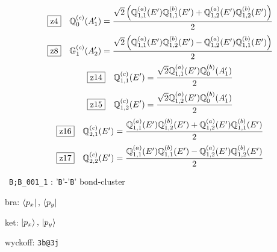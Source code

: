 \documentclass[fleqn,10pt,landscape]{jsarticle}
\begin{document}
\begin{dmath*}
\hspace*{3mm}\fbox{z4}\quad \mathbb{Q}_{0}^{(c)}(A_{1}^{\prime})=\frac{\sqrt{2} \left(\mathbb{Q}_{1,1}^{(a)}(E^{\prime}) \mathbb{Q}_{1,1}^{(b)}(E^{\prime}) + \mathbb{Q}_{1,2}^{(a)}(E^{\prime}) \mathbb{Q}_{1,2}^{(b)}(E^{\prime})\right)}{2}
\end{dmath*}
\begin{dmath*}
\hspace*{3mm}\fbox{z8}\quad \mathbb{G}_{1}^{(c)}(A_{2}^{\prime})=\frac{\sqrt{2} \left(\mathbb{Q}_{1,1}^{(a)}(E^{\prime}) \mathbb{Q}_{1,2}^{(b)}(E^{\prime}) - \mathbb{Q}_{1,2}^{(a)}(E^{\prime}) \mathbb{Q}_{1,1}^{(b)}(E^{\prime})\right)}{2}
\end{dmath*}
\begin{dmath*}
\hspace*{3mm}\fbox{z14}\quad \mathbb{Q}_{1,1}^{(c)}(E^{\prime})=\frac{\sqrt{2} \mathbb{Q}_{1,1}^{(a)}(E^{\prime}) \mathbb{Q}_{0}^{(b)}(A_{1}^{\prime})}{2}
\end{dmath*}
\begin{dmath*}
\hspace*{3mm}\fbox{z15}\quad \mathbb{Q}_{1,2}^{(c)}(E^{\prime})=\frac{\sqrt{2} \mathbb{Q}_{1,2}^{(a)}(E^{\prime}) \mathbb{Q}_{0}^{(b)}(A_{1}^{\prime})}{2}
\end{dmath*}
\begin{dmath*}
\hspace*{3mm}\fbox{z16}\quad \mathbb{Q}_{2,1}^{(c)}(E^{\prime})=\frac{\mathbb{Q}_{1,1}^{(a)}(E^{\prime}) \mathbb{Q}_{1,2}^{(b)}(E^{\prime}) + \mathbb{Q}_{1,2}^{(a)}(E^{\prime}) \mathbb{Q}_{1,1}^{(b)}(E^{\prime})}{2}
\end{dmath*}
\begin{dmath*}
\hspace*{3mm}\fbox{z17}\quad \mathbb{Q}_{2,2}^{(c)}(E^{\prime})=\frac{\mathbb{Q}_{1,1}^{(a)}(E^{\prime}) \mathbb{Q}_{1,1}^{(b)}(E^{\prime}) - \mathbb{Q}_{1,2}^{(a)}(E^{\prime}) \mathbb{Q}_{1,2}^{(b)}(E^{\prime})}{2}
\end{dmath*}
\vspace{5mm}

\noindent\textbullet\, \texttt{B;B_001_1} : '\texttt{B}'-'\texttt{B}' bond-cluster

\noindent\quad * bra: $\bra{p_{x}},\, \bra{p_{y}}$

\noindent\quad * ket: $\ket{p_{x}},\, \ket{p_{y}}$

\noindent\quad * wyckoff: \texttt{3b@3j}
\end{document}
